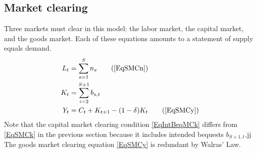 \documentclass[letterpaper,12pt]{article}
\theoremstyle{definition}
\numberwithin{equation}{section}
\numberwithin{exercise}{section}
\begin{document}
\begin{spacing}{1.5}
   \subsection{Market clearing}\label{SecSperIntBeqMC}

      Three markets must clear in this model: the labor market, the capital market, and the goods market. Each of these equations amounts to a statement of supply equals demand.
      \begin{align}
         L_t &= \sum_{s=1}^S n_s \tag{\ref{EqSMCn}} \\
         K_t &= \sum_{i=2}^{S+1} b_{s,t} \label{EqIntBeqMCk} \\
         Y_t &= C_t + K_{t+1} - (1-\delta)K_t \tag{\ref{EqSMCy}}
      \end{align}
      Note that the capital market clearing condition \eqref{EqIntBeqMCk} differs from \eqref{EqSMCk} in the previous section because it includes intended bequests $b_{S+1,t}$.jj The goods market clearing equation \eqref{EqSMCy} is redundant by Walras' Law.





\end{spacing}
\end{document}
